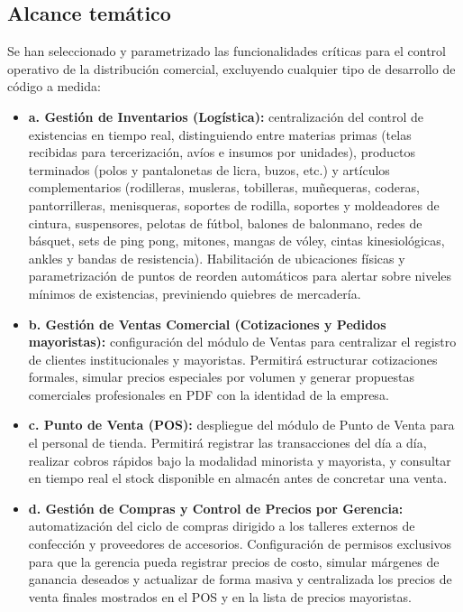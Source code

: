 \subsection{Alcance temático}
\begin{indentedsubsection}
Se han seleccionado y parametrizado las funcionalidades críticas para el control operativo de la distribución comercial, excluyendo cualquier tipo de desarrollo de código a medida:

\begin{itemize}
    \item \textbf{a. Gestión de Inventarios (Logística):} centralización del control de existencias en tiempo real, distinguiendo entre materias primas (telas recibidas para tercerización, avíos e insumos por unidades), productos terminados (polos y pantalonetas de licra, buzos, etc.) y artículos complementarios (rodilleras, musleras, tobilleras, muñequeras, coderas, pantorrilleras, menisqueras, soportes de rodilla, soportes y moldeadores de cintura, suspensores, pelotas de fútbol, balones de balonmano, redes de básquet, sets de ping pong, mitones, mangas de vóley, cintas kinesiológicas, ankles y bandas de resistencia). Habilitación de ubicaciones físicas y parametrización de puntos de reorden automáticos para alertar sobre niveles mínimos de existencias, previniendo quiebres de mercadería.
    \item \textbf{b. Gestión de Ventas Comercial (Cotizaciones y Pedidos mayoristas):} configuración del módulo de Ventas para centralizar el registro de clientes institucionales y mayoristas. Permitirá estructurar cotizaciones formales, simular precios especiales por volumen y generar propuestas comerciales profesionales en PDF con la identidad de la empresa.
    \item \textbf{c. Punto de Venta (POS):} despliegue del módulo de Punto de Venta para el personal de tienda. Permitirá registrar las transacciones del día a día, realizar cobros rápidos bajo la modalidad minorista y mayorista, y consultar en tiempo real el stock disponible en almacén antes de concretar una venta.
    \item \textbf{d. Gestión de Compras y Control de Precios por Gerencia:} automatización del ciclo de compras dirigido a los talleres externos de confección y proveedores de accesorios. Configuración de permisos exclusivos para que la gerencia pueda registrar precios de costo, simular márgenes de ganancia deseados y actualizar de forma masiva y centralizada los precios de venta finales mostrados en el POS y en la lista de precios mayoristas.
\end{itemize}


\end{indentedsubsection}
